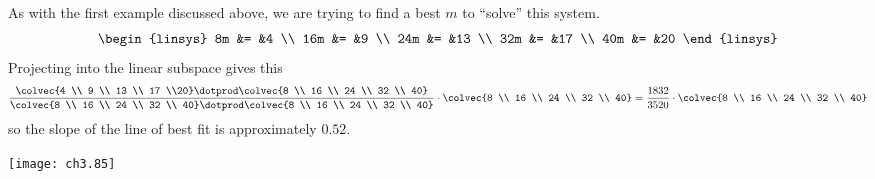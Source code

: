 \begin{ans}{1}
      As with the first example discussed above, we are trying to find a
      best $m$ to ``solve'' this system.
      \begin{equation*}
        \begin{linsys}{5}
          8m  &=  &4  \\
          16m &=  &9  \\
          24m &=  &13 \\
          32m &=  &17 \\
          40m &=  &20
        \end{linsys}
      \end{equation*}
      Projecting into the linear subspace gives this
      \begin{equation*}
        \frac{\colvec{4 \\ 9 \\ 13 \\ 17 \\20}
          \dotprod
          \colvec{8  \\ 16 \\ 24 \\ 32 \\ 40}}{%
          \colvec{8  \\ 16 \\ 24 \\ 32 \\ 40}
          \dotprod
          \colvec{8  \\ 16 \\ 24 \\ 32 \\ 40}}
        \cdot
        \colvec{8  \\ 16 \\ 24 \\ 32 \\ 40}
        =
        \frac{1832}{3520}
        \cdot
        \colvec{8  \\ 16 \\ 24 \\ 32 \\ 40}
      \end{equation*}
      so the slope of the line of best fit is approximately $0.52$.
      \begin{center}  \small
        \texttt{[image: ch3.85]}
      \end{center}
    
\end{ans}
